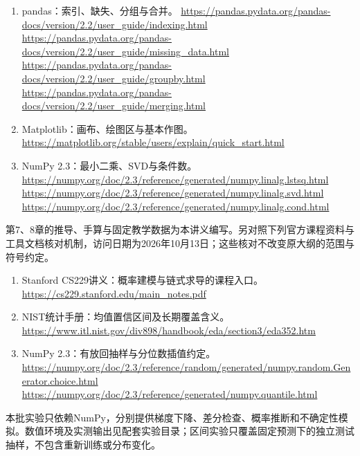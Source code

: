 \documentclass[UTF8,fontset=none,zihao=-4,a4paper]{ctexart}
\numberwithin{equation}{section}
\numberwithin{figure}{section}
\begin{document}
\begin{enumerate}
\item pandas：索引、缺失、分组与合并。\newline
\url{https://pandas.pydata.org/pandas-docs/version/2.2/user_guide/indexing.html}\newline
\url{https://pandas.pydata.org/pandas-docs/version/2.2/user_guide/missing_data.html}\newline
\url{https://pandas.pydata.org/pandas-docs/version/2.2/user_guide/groupby.html}\newline
\url{https://pandas.pydata.org/pandas-docs/version/2.2/user_guide/merging.html}
\item Matplotlib：画布、绘图区与基本作图。\newline
\url{https://matplotlib.org/stable/users/explain/quick_start.html}
\item NumPy 2.3：最小二乘、SVD与条件数。\newline
\url{https://numpy.org/doc/2.3/reference/generated/numpy.linalg.lstsq.html}\newline
\url{https://numpy.org/doc/2.3/reference/generated/numpy.linalg.svd.html}\newline
\url{https://numpy.org/doc/2.3/reference/generated/numpy.linalg.cond.html}
\end{enumerate}
\endgroup
第7、8章的推导、手算与固定教学数据为本讲义编写。另对照下列官方课程资料与工具文档核对机制，访问日期为2026年10月13日；这些核对不改变原大纲的范围与符号约定。
\begin{enumerate}
\item Stanford CS229讲义：概率建模与链式求导的课程入口。\newline
\url{https://cs229.stanford.edu/main_notes.pdf}
\item NIST统计手册：均值置信区间及长期覆盖含义。\newline
\url{https://www.itl.nist.gov/div898/handbook/eda/section3/eda352.htm}
\item NumPy 2.3：有放回抽样与分位数插值约定。\newline
\url{https://numpy.org/doc/2.3/reference/random/generated/numpy.random.Generator.choice.html}\newline
\url{https://numpy.org/doc/2.3/reference/generated/numpy.quantile.html}
\end{enumerate}
本批实验只依赖NumPy，分别提供梯度下降、差分检查、概率推断和不确定性模拟。数值环境及实测输出见配套实验目录；区间实验只覆盖固定预测下的独立测试抽样，不包含重新训练或分布变化。
\end{document}
